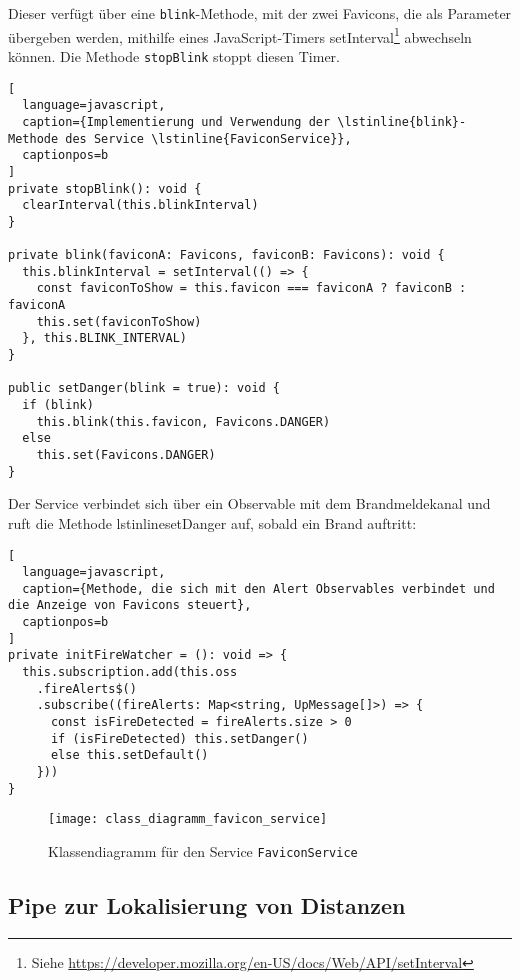 Dieser verfügt über eine \lstinline{blink}-Methode, mit der zwei Favicons, die als Parameter übergeben werden, mithilfe eines JavaScript-Timers setInterval\footnote{Siehe \href{https://developer.mozilla.org/en-US/docs/Web/API/setInterval}{https://developer.mozilla.org/en-US/docs/Web/API/setInterval}} abwechseln können.
Die Methode \lstinline{stopBlink} stoppt diesen Timer.

\begin{lstlisting}[
  language=javascript,
  caption={Implementierung und Verwendung der \lstinline{blink}-Methode des Service \lstinline{FaviconService}},
  captionpos=b
]
private stopBlink(): void {
  clearInterval(this.blinkInterval)
}

private blink(faviconA: Favicons, faviconB: Favicons): void {
  this.blinkInterval = setInterval(() => {
    const faviconToShow = this.favicon === faviconA ? faviconB : faviconA
    this.set(faviconToShow)
  }, this.BLINK_INTERVAL)
}

public setDanger(blink = true): void {
  if (blink)
    this.blink(this.favicon, Favicons.DANGER)
  else
    this.set(Favicons.DANGER)
}
\end{lstlisting}

Der Service verbindet sich über ein Observable mit dem Brandmeldekanal und ruft die Methode lstinline{setDanger} auf, sobald ein Brand auftritt:

\begin{lstlisting}[
  language=javascript,
  caption={Methode, die sich mit den Alert Observables verbindet und die Anzeige von Favicons steuert},
  captionpos=b
]
private initFireWatcher = (): void => {
  this.subscription.add(this.oss
    .fireAlerts$()
    .subscribe((fireAlerts: Map<string, UpMessage[]>) => {
      const isFireDetected = fireAlerts.size > 0
      if (isFireDetected) this.setDanger()
      else this.setDefault()
    }))
}
\end{lstlisting}

\begin{figure}[H]
  \centering
  \texttt{[image: class\_diagramm\_favicon\_service]}
  \caption{Klassendiagramm für den Service \lstinline{FaviconService}}
  \label{fig:class_diagramm_favicon_service}
\end{figure}

\subsection{Pipe zur Lokalisierung von Distanzen}

